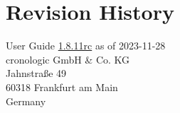 \documentclass[12pt,notitlepage,a4paper]{report}
\newcommand{\ttinput}[1]{}
\newcommand{\ttinput}[1]{}
\newcommand{\ttinput}[1]{}
\newcommand{\ugrev}{{1.8.11rc}}
\begin{document}
	\chapter{Revision History} 
		\noindent
		User Guide \hyperlink{ugrev}{\ugrev} as of 2023-11-28\\  %
		cronologic GmbH \& Co. KG\\
		Jahnstraße 49\\
		60318 Frankfurt am Main\\Germany\\
		\ttinput{FwRev.tex}
		\ifxHPTDC{}{} 
		

\end{document}
